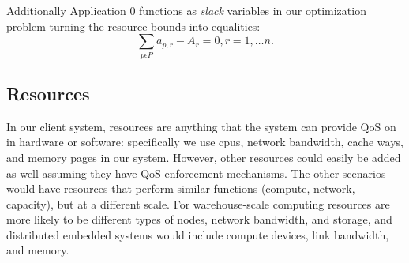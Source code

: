 Additionally Application 0 functions as \emph{slack} variables in our optimization problem turning the resource bounds into equalities:
\begin{equation}
\sum_{p\epsilon P} a_{p,r} - A_r = 0, r = 1,\dots n.
\end{equation}

\subsection*{Resources}

In our client system, resources are anything that the system can provide QoS on in hardware or software: specifically we use cpus, network bandwidth, cache ways, and memory pages in our system.  However, other resources could easily be added as well assuming they have QoS enforcement mechanisms.  The other scenarios would have resources that perform similar functions (compute, network, capacity), but at a different scale. For warehouse-scale computing resources are more likely to be different types of nodes, network bandwidth, and storage, and distributed embedded systems would include compute devices, link bandwidth, and memory. 

